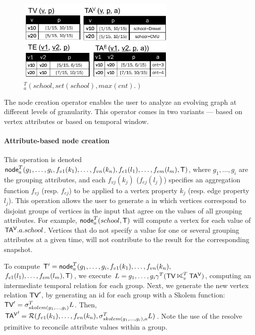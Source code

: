 \begin{figure}[b]
\includegraphics[width=3in]{figs/agg3.pdf}
\vspace{-0.2cm}
\caption{$^T_a(school, set(school), max(cnt).)$}
\vspace{-0.4cm}
\label{fig:tg_agg3}
\end{figure}

The node creation operator enables the user to analyze an evolving
graph at different levels of granularity.  This operator comes in two
variants --- based on vertex attributes or based on temporal window.

\paragraph*{Attribute-based node creation} This operation is denoted
$\textsf{node}^T_a(g_1,\ldots,g_i,f_{v1}(k_1),\ldots,f_{vn}(k_n),f_{e1}(l_1),\ldots,f_{em}(l_m),\mathsf{T})$,
where $g_1,\ldots,g_i$ are the grouping attributes, and each
$f_{vj}(k_j)$ ($f_{ej}(l_j)$) specifies an aggregation function
$f_{vj}$ (resp. $f_{ej}$) to be applied to a vertex property $k_j$
(resp. edge property $l_j$).  This operation allows the user to
generate a \tg in which vertices correspond to disjoint groups of
vertices in the input that agree on the values of all grouping
attributes.  For example, $\textsf{node}^T_a(school,\mathsf{T})$ will compute
a vertex for each value of $\mathsf{TA^{V}}.a.school$.  Vertices that do not
specify a value for one or several grouping attributes at a given
time, will not contribute to the result for the corresponding
snapshot.

To compute $\mathsf{T}' =
\textsf{node}^T_a(g_1,\ldots,g_i,f_{v1}(k_1),\ldots,f_{vn}(k_n),$ \\ 
$f_{e1}(l_1),\ldots,f_{em}(l_m),\mathsf{T})$,
we execute $L = g_1,\ldots,g_i \gamma^T (\tv \rightouterjoin^T_v
\tav)$, computing an intermediate temporal relation for each group.
Next, we generate the new vertex relation $\textsf{TV}'$, by generating an id
for each group with a Skolem function: $\textsf{TV}' =
\sigma^T_{skolem(g_1,\ldots,g_i)}L$.  Then,\\
$\mathsf{TA^{V}}' =
\mathcal{R}(f_{v1}(k_1), \ldots,
  f_{vn}(k_n),\sigma^T_{skolem(g_1,\ldots,g_i), a} L)$.  Note the use
of the resolve primitive to reconcile attribute values within a group.

